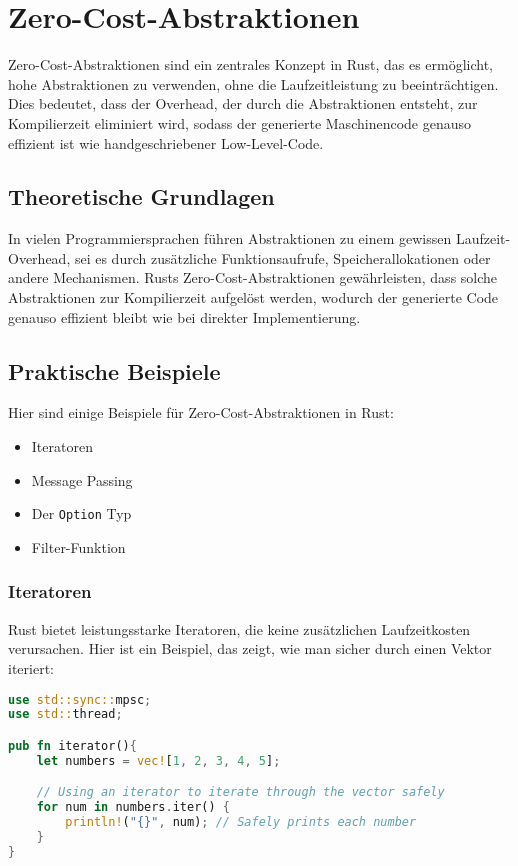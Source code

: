 \chapter{Zero-Cost-Abstraktionen}

Zero-Cost-Abstraktionen sind ein zentrales Konzept in Rust, das es ermöglicht, hohe Abstraktionen zu verwenden, ohne die Laufzeitleistung zu beeinträchtigen. 
Dies bedeutet, dass der Overhead, der durch die Abstraktionen entsteht, zur Kompilierzeit eliminiert wird, sodass der generierte Maschinencode genauso effizient ist wie handgeschriebener Low-Level-Code.

\section{Theoretische Grundlagen}

In vielen Programmiersprachen führen Abstraktionen zu einem gewissen Laufzeit-Overhead, sei es durch zusätzliche Funktionsaufrufe, Speicherallokationen oder andere Mechanismen.
Rusts Zero-Cost-Abstraktionen gewährleisten, dass solche Abstraktionen zur Kompilierzeit aufgelöst werden, wodurch der generierte Code genauso effizient bleibt wie bei direkter Implementierung.

\section{Praktische Beispiele}

Hier sind einige Beispiele für Zero-Cost-Abstraktionen in Rust:

\begin{itemize}
    \item Iteratoren
    \item Message Passing
    \item Der \texttt{Option} Typ
    \item Filter-Funktion
\end{itemize}

\subsection{Iteratoren}

Rust bietet leistungsstarke Iteratoren, die keine zusätzlichen Laufzeitkosten verursachen. 
Hier ist ein Beispiel, das zeigt, wie man sicher durch einen Vektor iteriert:

\begin{lstlisting}[language=Rust, caption=Iterator-Beispiel]
use std::sync::mpsc;
use std::thread;

pub fn iterator(){
    let numbers = vec![1, 2, 3, 4, 5];

    // Using an iterator to iterate through the vector safely
    for num in numbers.iter() {
        println!("{}", num); // Safely prints each number
    }
}
\end{lstlisting}

